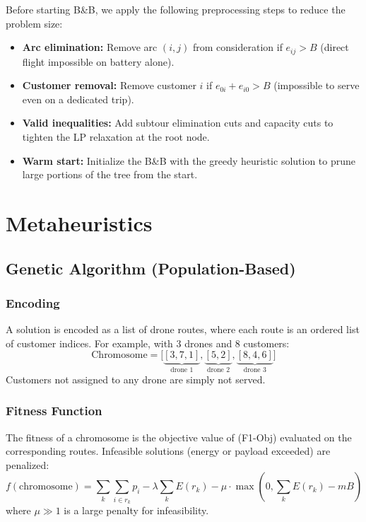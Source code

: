 \documentclass[12pt,a4paper]{article}
\begin{document}
Before starting B\&B, we apply the following preprocessing steps to reduce the problem
size:

\begin{itemize}
  \item \textbf{Arc elimination:} Remove arc $(i,j)$ from consideration if
  $e_{ij} > B$ (direct flight impossible on battery alone).
  \item \textbf{Customer removal:} Remove customer $i$ if $e_{0i} + e_{i0} > B$
  (impossible to serve even on a dedicated trip).
  \item \textbf{Valid inequalities:} Add subtour elimination cuts and capacity cuts
  to tighten the LP relaxation at the root node.
  \item \textbf{Warm start:} Initialize the B\&B with the greedy heuristic solution
  to prune large portions of the tree from the start.
\end{itemize}

\section{Metaheuristics}

\subsection{Genetic Algorithm (Population-Based)}

\subsubsection{Encoding}

A solution is encoded as a list of drone routes, where each route is an ordered list
of customer indices. For example, with 3 drones and 8 customers:
\[
  \text{Chromosome} = \bigl[\underbrace{[3,7,1]}_{\text{drone 1}},
                             \underbrace{[5,2]}_{\text{drone 2}},
                             \underbrace{[8,4,6]}_{\text{drone 3}}\bigr]
\]
Customers not assigned to any drone are simply not served.

\subsubsection{Fitness Function}

The fitness of a chromosome is the objective value of (F1-Obj) evaluated on the
corresponding routes. Infeasible solutions (energy or payload exceeded) are penalized:
\[
  f(\text{chromosome}) = \sum_{k} \sum_{i \in r_k} p_i
  - \lambda \sum_k E(r_k)
  - \mu \cdot \max\!\left(0, \sum_k E(r_k) - mB\right)
\]
where $\mu \gg 1$ is a large penalty for infeasibility.
\end{document}
